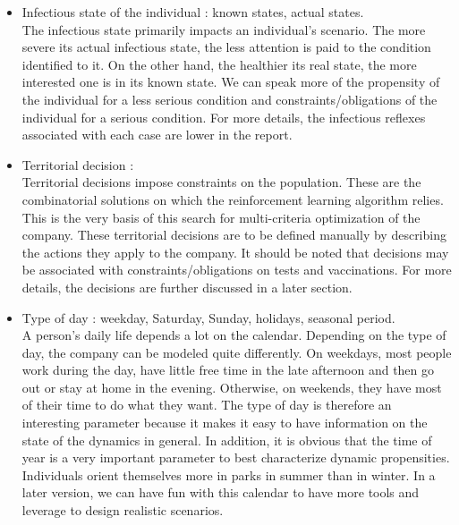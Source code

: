 \begin{itemize}

\item Infectious state of the individual : known states, actual states.\\
The infectious state primarily impacts an individual's scenario. The more severe its actual infectious state, the less attention is paid to the condition identified to it. On the other hand, the healthier its real state, the more interested one is in its known state. We can speak more of the propensity of the individual for a less serious condition and constraints/obligations of the individual for a serious condition. For more details, the infectious reflexes associated with each case are lower in the report.\\

\item Territorial decision :\\
Territorial decisions impose constraints on the population. These are the combinatorial solutions on which the reinforcement learning algorithm relies. This is the very basis of this search for multi-criteria optimization of the company. These territorial decisions are to be defined manually by describing the actions they apply to the company. It should be noted that decisions may be associated with constraints/obligations on tests and vaccinations. For more details, the decisions are further discussed in a later section.\\

\item Type of day : weekday, Saturday, Sunday, holidays, seasonal period.\\
A person's daily life depends a lot on the calendar. Depending on the type of day, the company can be modeled quite differently. On weekdays, most people work during the day, have little free time in the late afternoon and then go out or stay at home in the evening. Otherwise, on weekends, they have most of their time to do what they want. The type of day is therefore an interesting parameter because it makes it easy to have information on the state of the dynamics in general. In addition, it is obvious that the time of year is a very important parameter to best characterize dynamic propensities. Individuals orient themselves more in parks in summer than in winter. In a later version, we can have fun with this calendar to have more tools and leverage to design realistic scenarios.\\


\end{itemize}

